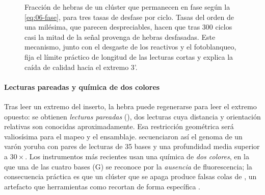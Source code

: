 \begin{figure}[t]
\centering
{}
\caption[Desfase acumulado en Illumina]{Fracción de hebras de un clúster que permanecen en fase según la \cref{eq:06-fase}, para tres tasas de desfase por ciclo. Tasas del orden de una milésima, que parecen despreciables, hacen que tras 300 ciclos casi la mitad de la señal provenga de hebras desfasadas. Este mecanismo, junto con el desgaste de los reactivos y el fotoblanqueo, fija el límite práctico de longitud de las lecturas cortas y explica la caída de calidad hacia el extremo 3'.}
\label{fig:06-fase}
\end{figure}

\paragraph{Lecturas pareadas y química de dos colores} Tras leer un extremo del inserto, la hebra puede regenerarse para leer el extremo opuesto: se obtienen \emph{lecturas pareadas} (), dos lecturas cuya distancia y orientación relativas son conocidas aproximadamente. Esa restricción geométrica será valiosísima para el mapeo y el ensamblaje. \textcite{c06-bentley2008} secuenciaron así el genoma de un varón yoruba con pares de lecturas de 35 bases y una profundidad media superior a $30\times$. Los instrumentos más recientes usan una química de \emph{dos colores}, en la que una de las cuatro bases (G) se reconoce por la \emph{ausencia} de fluorescencia; la consecuencia práctica es que un clúster que se apaga produce falsas colas de , un artefacto que herramientas como  recortan de forma específica \parencite{c06-chen2018}.

